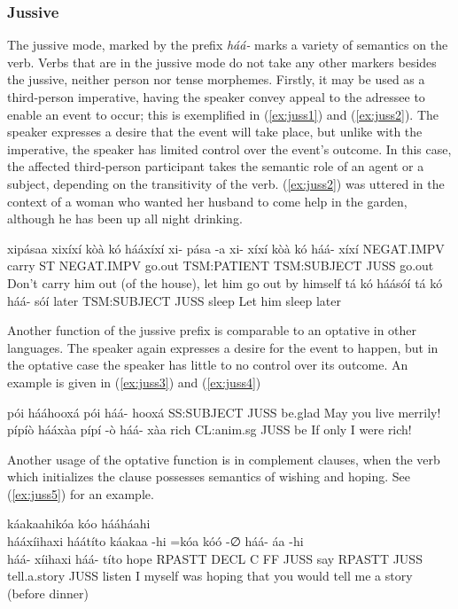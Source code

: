 \documentclass[a4paper, 12pt, oneside]{memoir}
\newcommand{\emh}[1]{\textit{#1}}
\begin{document}
\subsubsection{Jussive}
The jussive mode, marked by the prefix \emh{háá-} marks a variety of semantics on the verb. Verbs that are in the jussive mode do not take any other markers besides the jussive, neither person nor tense morphemes. Firstly, it may be used as a third-person imperative, having the speaker convey appeal to the adressee to enable an event to occur; this is exemplified in (\ref{ex:juss1}) and (\ref{ex:juss2}). The speaker expresses a desire that the event will take place, but unlike with the imperative, the speaker has limited control over the event's outcome. In this case, the affected third-person participant takes the semantic role of an agent or a subject, depending on the transitivity of the verb. (\ref{ex:juss2}) was uttered in the context of a woman who wanted her husband to come help in the garden, although he has been up all night drinking.
\begin{examples}
    \ex \label{ex:juss1}
    \words xipásaa xixíxí kòà kó hááxíxí
    \bits xi- pása -a xi- xíxí kòà kó háá- xíxí
    \gloss NEGAT.IMPV carry ST NEGAT.IMPV go.out TSM:PATIENT TSM:SUBJECT JUSS go.out
    \tr Don't carry him out (of the house), let him go out by himself
    \ex \label{ex:juss2}
    \words tá kó háásóí
    \bits tá kó háá- sóí
    \gloss later TSM:SUBJECT JUSS sleep 
    \tr Let him sleep later
\end{examples}
Another function of the jussive prefix is comparable to an optative in other languages. The speaker again expresses a desire for the event to happen, but in the optative case the speaker has little to no control over its outcome. An example is given in (\ref{ex:juss3}) and (\ref{ex:juss4})
\begin{examples}
    \ex \label{ex:juss3}
    \words pói hááhooxá
    \bits pói háá- hooxá 
    \gloss SS:SUBJECT JUSS be.glad
    \tr May you live merrily!
    \ex \label{ex:juss4}
    \words pípíò hááxàa
    \bits pípí -ò háá- xàa
    \gloss rich CL:anim.sg JUSS be 
    \tr If only I were rich!
\end{examples}
Another usage of the optative function is in complement clauses, when the verb which initializes the clause possesses semantics of wishing and hoping. See (\ref{ex:juss5}) for an example.
\begin{examples}
    \ex \label{ex:juss5}
    \words káakaahikóa kóo hááháahi \\ hááxíihaxi háátíto
    \bits káakaa -hi =kóa kóó -∅ háá- áa -hi \\ háá- xíihaxi háá- títo
    \gloss hope RPASTT DECL C FF JUSS say RPASTT JUSS tell.a.story JUSS listen
    \tr I myself was hoping that you would tell me a story (before dinner)
\end{examples}
\end{document}
